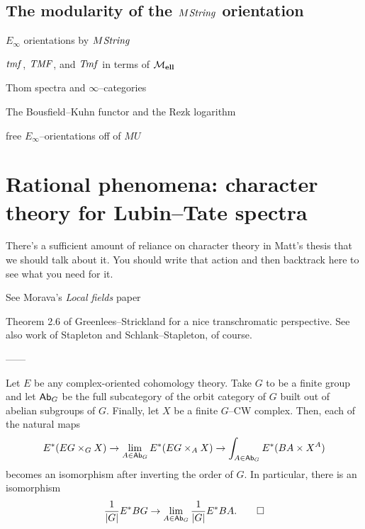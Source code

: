 \subsection*{The modularity of the $M\mathit{String}$ orientation}

$E_\infty$ orientations by $M\mathit{String}$

$\mathit{tmf}$, $\mathit{TMF}$, and $\mathit{Tmf}$ in terms of $\mathcal{M}_{\mathbf{ell}}$

Thom spectra and $\infty$--categories

The Bousfield--Kuhn functor and the Rezk logarithm

free $E_\infty$--orientations off of $MU$










\section{Rational phenomena: character theory for Lubin--Tate spectra}

There's a sufficient amount of reliance on character theory in Matt's thesis that we should talk about it.  You should write that action and then backtrack here to see what you need for it.

See Morava's \textit{Local fields} paper

\begin{remark}
Theorem 2.6 of Greenlees--Strickland for a nice transchromatic perspective.  See also work of Stapleton and Schlank--Stapleton, of course.
\end{remark}


------

\begin{theorem}
Let $E$ be any complex-oriented cohomology theory.  Take $G$ to be a finite group and let $\mathsf{Ab}_G$ be the full subcategory of the orbit category of $G$ built out of abelian subgroups of $G$.  Finally, let $X$ be a finite $G$--CW complex.  Then, each of the natural maps \[E^*(EG \times_G X) \to \lim_{A \in \mathsf{Ab}_G} E^*(EG \times_A X) \to \int_{A \in \mathsf{Ab}_G} E^*(BA \times X^A)\] becomes an isomorphism after inverting the order of $G$.  In particular, there is an isomorphism \[\frac{1}{|G|} E^* BG \to \lim_{A \in \mathsf{Ab}_G} \frac{1}{|G|} E^* BA. \qed\]
\end{theorem}

